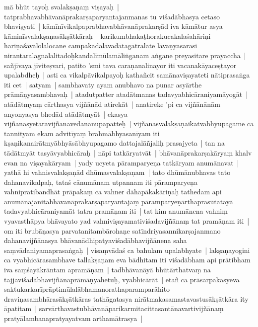 \documentclass[article,12pt,a4paper]{memoir}
\begin{document}
	  \pstart mā bhūt tayoḥ svalakṣaṇaṃ viṣayaḥ | tatprabhavabhāvanāprakarṣaparyantajanmanas tu viśadābhasya cetaso bhaviṣyati | kāmīnīvikalpaprabhavabhāvanāprakarṣād iva kāmātur asya kāminīsvalakṣaṇasākṣātkāraḥ | karikumbhakaṭhorakucakalaśahāriṇi hariṇaśāvalolalocane campakadalāvadātagātralate lāvaṇyasarasi nirantaralagnalalitadoḥkandalīmūlamāliṅganam aṅgane preyasitare prayaccha | sañjīvaya jīviteṣvari, patito 'smi tava caraṇanalinayor iti vacanakāyaceṣṭayor upalabdheḥ | asti ca vikalpāvikalpayoḥ kathañcit samānaviṣayateti nātiprasaṅga iti cet | satyam | sambhavaty ayam anubhavo na punar asyārthe prāmāṇyasambhavaḥ | atadutpatter atadātmanas tadavyabhicāraniyamāyogāt | atādātmyaṃ cārthasya vijñānād atirekāt | anatireke 'pi ca vijñānānām anyonyasya bhedād atādātmyāt | ekasya vijñānasyetaravijñānavedanānupapatteḥ | vijñānasvalakṣaṇaikatvābhyupagame ca tannityam ekam advitīyaṃ brahmābhyasanīyam iti kṣaṇikanairātmyābhyāsābhyupagamo dattajalāñjaliḥ prasajyeta | tan na tādātmyāt tasyāvyabhicāraḥ | nāpi tatkāryatvāt | bhāvanāprakarṣakāryaṃ khalv evan na viṣayakāryam | yady ucyeta pāramparyeṇa tatkāryam anumānavat | yathā hi vahnisvalakṣaṇād dhūmasvalakṣaṇam | tato dhūmānubhavas tato dahanavikalpaḥ, tataś cānumānam utpannam iti pāramparyeṇa vahnipratibandhāt prāpakaṃ ca vahner dāhapākakāriṇaḥ tathedam api anumānajanitabhāvanāprakarṣaparyantajaṃ pāramparyeṇārthaprasūtatayā tadavyabhicāraniyamāt tatra pramāṇam iti | tat kim anumānena vahniṃ vyavasthāpya bhāvayato yad vahniviṣayamativiśadavijñānaṃ tat pramāṇam iti | om iti brubāṇasya parvatanitambārohaṇe satīndriyasannikarṣajanmano dahanavijñānasya bhāvanādhipatyaviśadābhavijñānena saha saṃvādaniyamaprasaṅgaḥ | visaṃvādaś ca bahulam upalabhyate | lakṣaṇayogini ca vyabhicārasambhave tallakṣaṇam eva bādhitam iti viśadābham api prātibham iva saṃśayākrāntam apramāṇam | tadbhāvanāyā bhūtārthatvaṃ na tajjaviśadābhavijñānaprāmāṇyahetuḥ, vyabhicārāt | etañ ca prāsarpakasyeva saktukarkarīprāptimūlalābhamanorathaparamparāhito draviṇasambhārasākṣātkāras tathāgatasya nirātmakasamastavastusākṣātkāra ity āpatitam | sarvārthavastubhāvanāparikarmitacittasantānavartivijñānaṃ pratyālambanapratyayatvam arthamātrasya | 
	\pend
      
\end{document}
